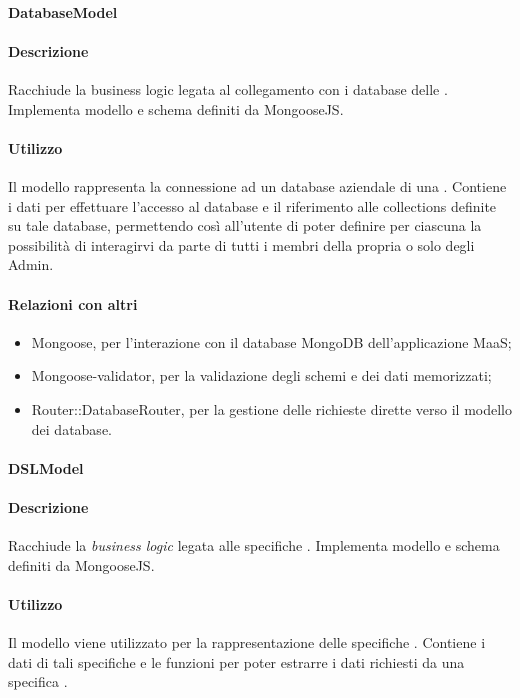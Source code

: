 \paragraph{DatabaseModel}
\paragraph*{Descrizione}

Racchiude la business logic legata al collegamento con i database delle . Implementa modello e schema definiti da MongooseJS.

\paragraph*{Utilizzo}
Il modello rappresenta la connessione ad un database aziendale di una . Contiene i dati per effettuare l'accesso al database e il riferimento alle collections definite su tale database, permettendo così all'utente di poter definire per ciascuna  la possibilità di interagirvi da parte di tutti i membri della propria  o solo degli Admin.

\paragraph*{Relazioni con altri }
\begin{itemize}
\item Mongoose, per l'interazione con il database MongoDB dell'applicazione MaaS;
\item Mongoose-validator, per la validazione degli schemi e dei dati memorizzati;
\item Router::DatabaseRouter, per la gestione delle richieste dirette verso il modello dei database.
\end{itemize}

\paragraph{DSLModel}
\paragraph*{Descrizione}

Racchiude la \textit{business logic} legata alle specifiche . Implementa modello e schema definiti da MongooseJS.

\paragraph*{Utilizzo}
Il modello viene utilizzato per la rappresentazione delle specifiche . Contiene i dati di tali specifiche e le funzioni per poter estrarre i dati richiesti da una specifica .


